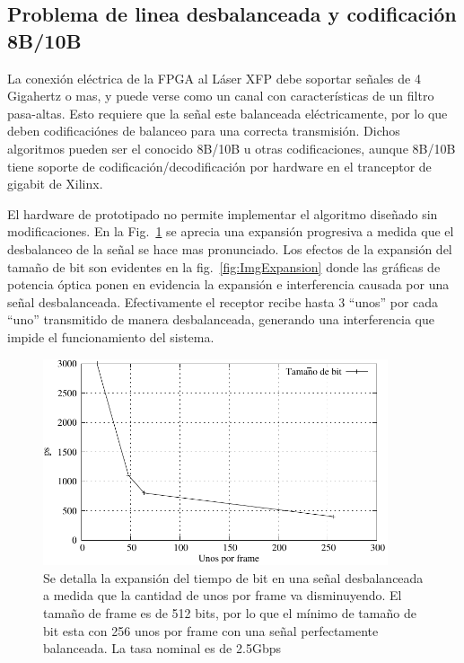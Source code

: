\subsection{Problema de linea desbalanceada y codificación 8B/10B}
La conexión eléctrica de la FPGA al Láser XFP debe soportar señales de 4 Gigahertz o mas, y puede verse como un canal con características de un filtro pasa-altas. Esto requiere que la señal este balanceada eléctricamente, por lo que deben codificaciónes de balanceo para una correcta transmisión. Dichos algoritmos pueden ser el conocido 8B/10B u otras codificaciones, aunque 8B/10B tiene soporte de codificación/decodificación por hardware en el tranceptor de gigabit de Xilinx.

El hardware de prototipado no permite implementar el algoritmo diseñado sin modificaciones. En la Fig.~\ref{fig:expansionbit} se aprecia una expansión progresiva a medida que el desbalanceo de la señal se hace mas pronunciado. Los efectos de la expansión del tamaño de bit son evidentes en la fig.~\ref{fig:ImgExpansion} donde las gráficas de potencia óptica ponen en evidencia la expansión e interferencia causada por una señal desbalanceada.
Efectivamente el receptor recibe hasta 3 ``unos'' por cada ``uno'' transmitido de manera desbalanceada, generando una interferencia que impide el funcionamiento del sistema.

\begin{figure}[t]
  \centering
    \includegraphics[width=4in]{graphs/expansionbit.pdf}
\caption {Se detalla la expansión del tiempo de bit en una señal desbalanceada a medida que la cantidad de unos por frame va disminuyendo. El tamaño de frame es de 512 bits, por lo que el mínimo de tamaño de bit esta con 256 unos por frame con una señal perfectamente balanceada. La tasa nominal es de 2.5Gbps}
\label{fig:expansionbit}
\end{figure}

